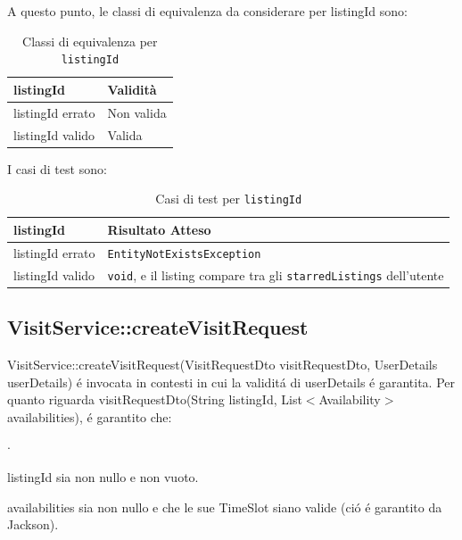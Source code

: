 A questo punto, le classi di equivalenza da considerare per listingId sono:
\begin{table}[h!]
    \centering
    \renewcommand{\arraystretch}{1.4}
    \begin{tabularx}{\textwidth}{|X|X|}
    \hline
    \textbf{listingId} & \textbf{Validità} \\
    \hline
    listingId errato & Non valida \\
    \hline
    listingId valido & Valida \\
    \hline
    \end{tabularx}
    \caption{Classi di equivalenza per \texttt{listingId}}
\end{table}
    
I casi di test sono:
\begin{table}[h!]
    \centering
    \renewcommand{\arraystretch}{1.4}
    \begin{tabularx}{\textwidth}{|X|X|}
    \hline
    \textbf{listingId} & \textbf{Risultato Atteso} \\
    \hline
    listingId errato & \texttt{EntityNotExistsException} \\
    \hline
    listingId valido & \texttt{void}, e il listing compare tra gli \texttt{starredListings} dell’utente \\
    \hline
    \end{tabularx}
    \caption{Casi di test per \texttt{listingId}}
\end{table}

\newpage

    
\subsection{VisitService::createVisitRequest}
VisitService::createVisitRequest(VisitRequestDto visitRequestDto, UserDetails userDetails) 
é invocata in contesti in cui la validitá di userDetails é garantita. 
Per quanto riguarda visitRequestDto(String listingId, List$<$Availability$>$ availabilities), 
é garantito che:
\begin{list}{$\cdot$}{}
    \item listingId sia non nullo e non vuoto.
    \item availabilities sia non nullo e che le sue TimeSlot siano 
    valide (ció é garantito da Jackson).
\end{list}

